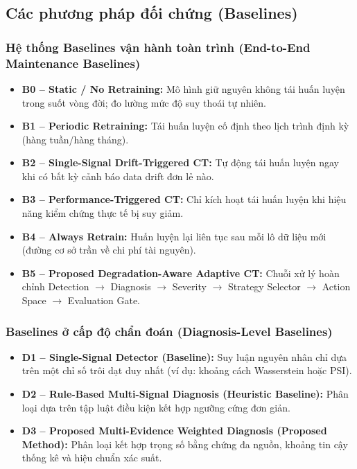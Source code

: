 \subsection{Các phương pháp đối chứng (Baselines)}

\subsubsection{Hệ thống Baselines vận hành toàn trình (End-to-End Maintenance Baselines)}
\begin{itemize}
  \item \textbf{B0 -- Static / No Retraining:} Mô hình giữ nguyên không tái huấn luyện trong suốt vòng đời; đo lường mức độ suy thoái tự nhiên.
  \item \textbf{B1 -- Periodic Retraining:} Tái huấn luyện cố định theo lịch trình định kỳ (hàng tuần/hàng tháng).
  \item \textbf{B2 -- Single-Signal Drift-Triggered CT:} Tự động tái huấn luyện ngay khi có bất kỳ cảnh báo data drift đơn lẻ nào.
  \item \textbf{B3 -- Performance-Triggered CT:} Chỉ kích hoạt tái huấn luyện khi hiệu năng kiểm chứng thực tế bị suy giảm.
  \item \textbf{B4 -- Always Retrain:} Huấn luyện lại liên tục sau mỗi lô dữ liệu mới (đường cơ sở trần về chi phí tài nguyên).
  \item \textbf{B5 -- Proposed Degradation-Aware Adaptive CT:} Chuỗi xử lý hoàn chỉnh Detection $\rightarrow$ Diagnosis $\rightarrow$ Severity $\rightarrow$ Strategy Selector $\rightarrow$ Action Space $\rightarrow$ Evaluation Gate.
\end{itemize}

\subsubsection{Baselines ở cấp độ chẩn đoán (Diagnosis-Level Baselines)}
\begin{itemize}
  \item \textbf{D1 -- Single-Signal Detector (Baseline):} Suy luận nguyên nhân chỉ dựa trên một chỉ số trôi dạt duy nhất (ví dụ: khoảng cách Wasserstein hoặc PSI).
  \item \textbf{D2 -- Rule-Based Multi-Signal Diagnosis (Heuristic Baseline):} Phân loại dựa trên tập luật điều kiện kết hợp ngưỡng cứng đơn giản.
  \item \textbf{D3 -- Proposed Multi-Evidence Weighted Diagnosis (Proposed Method):} Phân loại kết hợp trọng số bằng chứng đa nguồn, khoảng tin cậy thống kê và hiệu chuẩn xác suất.
\end{itemize}

